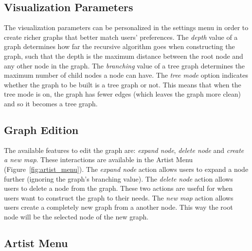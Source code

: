 \documentclass{article}
\begin{document}
    \subsection{Visualization Parameters}
    \label{sub:visualization_parameters}

      The visualization parameters can be personalized in the settings menu in order to create richer graphs that better match users' preferences.
      The \textit{depth} value of a graph determines how far the recursive algorithm goes when constructing the graph, such that the depth is the maximum distance between the root node and any other node in the graph.
      The \textit{branching} value of a tree graph determines the maximum number of child nodes a node can have.
      The \textit{tree mode} option indicates whether the graph to be built is a tree graph or not.
      This means that when the tree mode is on, the graph has fewer edges (which leaves the graph more clean) and so it becomes a tree graph.

    \subsection{Graph Edition}
    \label{sub:graph_edition}
      
      The available features to edit the graph are: \textit{expand node}, \textit{delete node} and \textit{create a new map}. These interactions are available in the Artist Menu (Figure~\ref{fig:artist_menu}).
      The \textit{expand node} action allows users to expand a node further (ignoring the graph's branching value).
      The \textit{delete node} action allows users to delete a node from the graph.
      These two actions are useful for when users want to construct the graph to their needs.
      The \emph{new map} action allows users create a completely new graph from a another node. This way the root node will be the selected node of the new graph.

    \subsection{Artist Menu}
    \label{sub:artist_menu}
    
\end{document}
